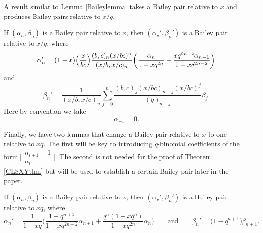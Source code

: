 A result similar to Lemma \ref{Baileylemma} takes a Bailey pair relative to $x$ and produces Bailey pairs relative to $x/q$.
\begin{Lemma} \label{Baileylatticelemma}
	If $(\alpha_n,\beta_n)$ is a Bailey pair relative to $x$, then $(\alpha_n',\beta_n')$ is a Bailey pair relative to $x/q$, where
	\begin{equation*} %
		\alpha_n' = (1-x) \Bigl(\frac{x}{bc} \Bigr) \frac{(b,c)_n(x/bc)^n}{(x/b,x/c)_n}\biggl(\frac{\alpha_n}{1-xq^{2n}} - \frac{xq^{2n-2}\alpha_{n-1}}{1-xq^{2n-2}} \biggr)
	\end{equation*}
and
	\begin{equation*} %
		\beta_n' = \frac{1}{(x/b,x/c)_n} \sum_{j=0}^n \frac{(b,c)_j(x/bc)_{n-j} (x/bc)^j}{(q)_{n-j}} \beta_j.
	\end{equation*}
Here by convention we take
	\begin{equation} \label{eqn:latticeextracond}
		\alpha_{-1} = 0.
	\end{equation}
\end{Lemma}


Finally, we have two lemmas that change a Bailey pair relative to $x$ to one relative to $xq$. The first will be key to introducing $q$-binomial coefficients of the form $\bigl[\begin{smallmatrix} n_{i+1} + 1 \\ n_i \end{smallmatrix}\bigr]$. The second is not needed for the proof of Theorem \ref{CLSXYthm} but will be used to establish a certain Bailey pair later in the paper.
\begin{Lemma}[\cite{Lo1}] \label{littlelemma}
	If $(\alpha_n,\beta_n)$ is a Bailey pair relative to $x$, then $(\alpha_n',\beta_n')$ is a Bailey pair relative to $xq$, where
	\begin{equation*} %
		\alpha_n' = \frac{1}{1-xq} \biggl(\frac{1-q^{n+1}}{1-xq^{2n+2}} \alpha_{n+1} + \frac{q^n(1-xq^n)}{1-xq^{2n}} \alpha_n \biggr)
	\qquad
	\text{and}
	\qquad %
		\beta_n' = \bigl(1-q^{n+1}\bigr)\beta_{n+1}.
	\end{equation*}
\end{Lemma}
